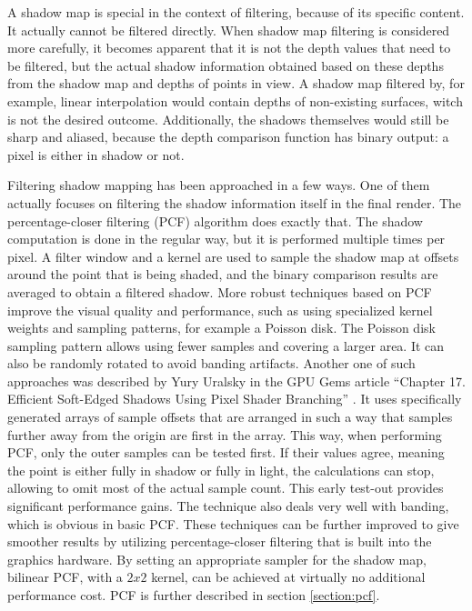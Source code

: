 A shadow map is special in the context of filtering, because of its specific content. It actually cannot be filtered directly. When shadow map filtering is considered more carefully, it becomes apparent that it is not the depth values that need to be filtered, but the actual shadow information obtained based on these depths from the shadow map and depths of points in view. A shadow map filtered by, for example, linear interpolation would contain depths of non-existing surfaces, witch is not the desired outcome. Additionally, the shadows themselves would still be sharp and aliased, because the depth comparison function has binary output: a pixel is either in shadow or not.

Filtering shadow mapping has been approached in a few ways. One of them actually focuses on filtering the shadow information itself in the final render. The percentage-closer filtering (PCF) \cite{bib:proc:reeves_pcf} algorithm does exactly that. The shadow computation is done in the regular way, but it is performed multiple times per pixel. A filter window and a kernel are used to sample the shadow map at offsets around the point that is being shaded, and the binary comparison results are averaged to obtain a filtered shadow. More robust techniques based on PCF improve the visual quality and performance, such as using specialized kernel weights and sampling patterns, for example a Poisson disk. The Poisson disk sampling pattern allows using fewer samples and covering a larger area. It can also be randomly rotated to avoid banding artifacts. Another one of such approaches was described by Yury Uralsky in the GPU Gems article ``Chapter 17. Efficient Soft-Edged Shadows Using Pixel Shader Branching'' \cite{bib:book:gpu_gems_2}. It uses specifically generated arrays of sample offsets that are arranged in such a way that samples further away from the origin are first in the array. This way, when performing PCF, only the outer samples can be tested first. If their values agree, meaning the point is either fully in shadow or fully in light, the calculations can stop, allowing to omit most of the actual sample count. This early test-out provides significant performance gains. The technique also deals very well with banding, which is obvious in basic PCF. These techniques can be further improved to give smoother results by utilizing percentage-closer filtering that is built into the graphics hardware. By setting an appropriate sampler for the shadow map, bilinear PCF, with a \(2x2\) kernel, can be achieved at virtually no additional performance cost. PCF is further described in section \ref{section:pcf}.

